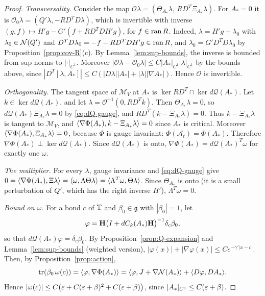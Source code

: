 \begin{proof}
\emph{Transversality.} Consider the map $\mathcal O\lambda=(\Theta_{A_*}\lambda,\,RD^T\Xi_{A_*}\lambda)$. For $A_*=0$ it is $\mathcal O_0\lambda=(Q'\lambda,-RD^TD\lambda)$, which is invertible with inverse $(g,f)\mapsto H'g-G'(f+RD^TDH'g)$, for $f\in\operatorname{ran} R$. Indeed, $\lambda=H'g+\lambda_0$ with $\lambda_0\in\mathcal N(Q')$ and $D^TD\lambda_0=-f-RD^TDH'g\in\operatorname{ran} R$, and $\lambda_0=G'D^TD\lambda_0$ by Proposition~\ref{prop:cov-R}(c). By Lemma~\ref{lem:sup-bounds}, the inverse is bounded from sup norms to $|\cdot|_{C^1}$. Moreover $|\mathcal O\lambda-\mathcal O_0\lambda|\le C|A_*|_{C^1}|\lambda|_{C^1}$ by the bounds above, since $|D^T[\lambda,A_*]|\le C(|D\lambda||A_*|+|\lambda||\nabla A_*|)$. Hence $\mathcal O$ is invertible.

\emph{Orthogonality.} The tangent space of $\mathcal M_V$ at $A_*$ is $\ker RD^T\cap\ker d\mathcal Q(A_*)$. Let $k\in\ker d\mathcal Q(A_*)$, and let $\lambda=\mathcal O^{-1}(0,RD^Tk)$. Then $\Theta_{A_*}\lambda=0$, so $d\mathcal Q(A_*)\Xi_{A_*}\lambda=0$ by \eqref{eq:dQ-gauge}, and $RD^T(k-\Xi_{A_*}\lambda)=0$. Thus $k-\Xi_{A_*}\lambda$ is tangent to $\mathcal M_V$, and $\langle \nabla\Phi(A_*),k-\Xi_{A_*}\lambda\rangle=0$ since $A_*$ is critical. Moreover $\langle \nabla\Phi(A_*),\Xi_{A_*}\lambda\rangle=0$, because $\Phi$ is gauge invariant: $\Phi(\mathcal A_t)=\Phi(A_*)$. Therefore $\nabla\Phi(A_*)\perp\ker d\mathcal Q(A_*)$. Since $d\mathcal Q(A_*)$ is onto, $\nabla\Phi(A_*)=d\mathcal Q(A_*)^T\omega$ for exactly one $\omega$.

\emph{The multiplier.} For every $\lambda$, gauge invariance and \eqref{eq:dQ-gauge} give $0=\langle \nabla\Phi(A_*),\Xi\lambda\rangle=\langle \omega,\Lambda\Theta\lambda\rangle=\langle \Lambda^T\omega,\Theta\lambda\rangle$. Since $\Theta_{A_*}$ is onto (it is a small perturbation of $Q'$, which has the right inverse $H'$), $\Lambda^T\omega=0$.

\emph{Bound on $\omega$.} For a bond $c$ of $\mathbb T$ and $\beta_0\in\mathfrak g$ with $|\beta_0|=1$, let
\[
\varphi=\mathbf H\big(I+dC_k(A_*)\mathbf H\big)^{-1}\delta_c\beta_0 ,
\]
so that $d\mathcal Q(A_*)\varphi=\delta_c\beta_0$. By Proposition~\ref{prop:Q-expansion} and Lemma~\ref{lem:sup-bounds} (weighted version), $|\varphi(x)|+|\nabla\varphi(x)|\le Ce^{-\gamma'|x-c|}$. Then, by Proposition~\ref{prop:action},
\[
\operatorname{tr}(\beta_0\,\omega(c))=\langle \varphi,\nabla\Phi(A_*)\rangle=\langle \varphi,J+\nabla\mathcal N(A_*)\rangle+\langle D\varphi,DA_*\rangle.
\]
Hence $|\omega(c)|\le C\big(\varepsilon+C(\varepsilon+\beta)^2+C(\varepsilon+\beta)\big)$, since $|A_*|_{C^1}\le C(\varepsilon+\beta)$.
\end{proof}

